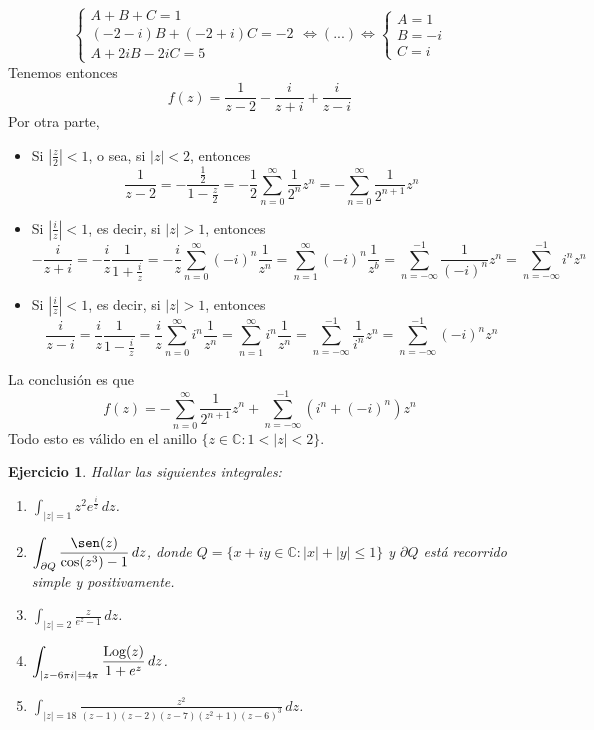 \documentclass[11pt]{report}
\makeatletter
\renewenvironment{proof}[1][\proofname]{\par
  \pushQED{\qed}%
  \normalfont \topsep\z@skip %
  \trivlist
  \item[\hskip\labelsep
        \itshape
    #1\@addpunct{.}]\ignorespaces
}{%
  \popQED\endtrivlist\@endpefalse
}
\newcommand{\C}{\mathbb C}
\newtheorem{ejercicio}{Ejercicio}
\makeatother
\begin{document}
\begin{proof}
\begin{enumerate}
    \[\begin{cases}
      A+B+C=1 \\
      (-2-i)B+(-2+i)C = -2 \\
      A+2iB-2iC = 5
    \end{cases} \iff (...) \iff \begin{cases}
      A=1 \\
      B=-i \\
      C=i
    \end{cases}\]
  Tenemos entonces
  \[
  f(z)=\frac{1}{z-2}-\frac{i}{z+i}+\frac{i}{z-i}\]
  Por otra parte,
  \begin{itemize}
    \item Si $|\frac{z}{2}|<1$, o sea, si $|z|<2$, entonces
    \[\frac{1}{z-2} = -\frac{\frac{1}{2}}{1-\frac{z}{2}} = -\frac{1}{2}\sum_{n=0}^\infty\frac{1}{2^n}z^n = -\sum_{n=0}^\infty\frac{1}{2^{n+1}}z^n \] 
    \item Si $|\frac{i}{z}| < 1$, es decir, si $|z|>1$, entonces
    \[-\frac{i}{z+i} = -\frac{i}{z}\frac{1}{1+\frac{i}{z}} = -\frac{i}{z}\sum_{n=0}^\infty(-i)^n\frac{1}{z^n} = \sum_{n=1}^\infty (-i)^n \frac{1}{z^b} = \sum_{n=-\infty}^{-1}\frac{1}{(-i)^n}z^n=\sum_{n=-\infty}^{-1}i^n z^n\]
    \item Si $|\frac{i}{z}|<1$, es decir, si $|z|>1$, entonces
    \[\frac{i}{z-i} = \frac{i}{z}\frac{1}{1-\frac{i}{z}} = \frac{i}{z}\sum_{n=0}^\infty i^n \frac{1}{z^n} = \sum_{n=1}^\infty i^n\frac{1}{z^n} = \sum_{n=-\infty}^{-1}\frac{1}{i^n}z^n=\sum_{n=-\infty}^{-1}(-i)^nz^n\]
  \end{itemize}
    La conclusión es que
    \[f(z)=-\sum_{n=0}^\infty \frac{1}{2^{n+1}}z^n + \sum_{n=-\infty}^{-1}(i^n+(-i)^n)z^n\]
    Todo esto es válido en el anillo $\{z \in \C \colon 1<|z|<2\}$. \qedhere \end{enumerate} 
\end{proof}

\begin{ejercicio}
  Hallar las siguientes integrales:
  \begin{enumerate}
    \item $\displaystyle \int_{|z|=1}z^2e^{\frac{i}{z}} \, dz$.
    \item $\displaystyle \int_{\partial Q}\frac{\sen(z)}{\cos(z^3)-1} \, dz$, donde $Q = \{x+iy \in \C \colon |x|+|y| \leq 1\}$ y $\partial Q$ está recorrido simple y positivamente.
    \item $\displaystyle \int_{|z|=2} \frac{z}{e^z-1} \, dz$.
    \item $\displaystyle \int_{|z-6\pi i| = 4\pi} \frac{\textup{Log}(z)}{1+e^z} \, dz$.
    \item $\displaystyle \int_{|z|=18} \frac{z^2}{(z-1)(z-2)(z-7)(z^2+1)(z-6)^3} \, dz$.
  \end{enumerate}
\end{ejercicio}
\end{document}
